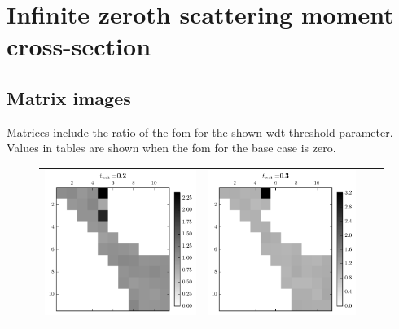 \section{Infinite zeroth scattering moment cross-section}
\label{sec:homog_inf_sp0_data}

\subsection{Matrix images}
\label{sec:homog_inf_sp0_mat}
Matrices include the ratio of the \gls{fom} for the shown \gls{wdt}
threshold parameter. Values in tables are shown when the \gls{fom} for
the base case is zero.

\begin{figure}[h]
  \centering
  \begin{tabular}{cccc}
    \includegraphics[scale=0.75]{images/results/matshows/homog_sp0_matshow_1}
    &
    \includegraphics[scale=0.75]{images/results/matshows/homog_sp0_matshow_2}

\end{tabular}
\end{figure}
